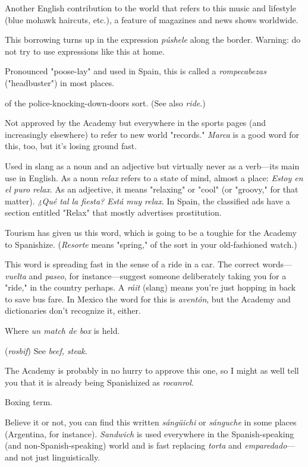  Another English contribution to the world that refers
to this music and lifestyle (blue mohawk haircuts, etc.), a feature of
magazines and news shows worldwide.

 This borrowing turns up in the expression \emph{púshele}
along the border. Warning: do not try to use expressions like this
at home.

 Pronounced "poose-lay" and used in Spain, this is
called a \emph{rompecabezas} ("headbuster") in most places.

 of the police-knocking-down-doors sort. (See also \emph{ride}.)

 Not approved by the Academy but everywhere in
the sports pages (and increasingly elsewhere) to refer to new world "records." \emph{Marca} is a good word for this, too, but it's losing ground fast.

 Used in slang as a noun and an adjective but virtually
never as a verb---its main use in English. As a noun \emph{relax} refers to a
state of mind, almost a place: \emph{Estoy en el puro relax}. As an adjective, it
means "relaxing" or "cool" (or "groovy," for that matter). \emph{¿Qué tal la
fiesta? Está muy relax}. In Spain, the classified ads have a section entitled "Relax" that mostly advertises prostitution.

 Tourism has given us this word, which is going to
be a toughie for the Academy to Spanishize. (\emph{Resorte} means "spring,"
of the sort in your old-fashioned watch.)

 This word is spreading fast in the sense of a ride in a
car. The correct words---\emph{vuelta} and \emph{paseo}, for instance---suggest someone deliberately taking you for a "ride," in the country perhaps. A \emph{ráit}
(slang) means you're just hopping in back to save bus fare. In Mexico
the word for this is \emph{aventón}, but the Academy and dictionaries don't
recognize it, either.

 Where \emph{un match de box} is held.

 (\emph{rosbif}) See \emph{beef, steak}.

 The Academy is probably in no
hurry to approve this one, so I might as well tell you that it is already being Spanishized as \emph{rocanrol}.

 Boxing term.

 Believe it or not, you can find this written \emph{sángüichi} or \emph{sánguche} in some places (Argentina, for instance). \emph{Sandwich} is used everywhere in the Spanish-speaking (and non-Spanish-speaking) world and is fast replacing \emph{torta} and \emph{emparedado}---and not
just linguistically.

